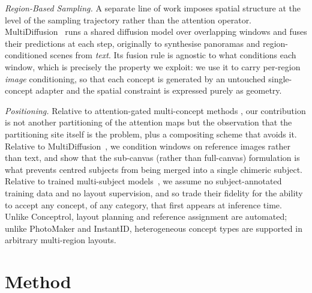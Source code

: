 \documentclass[review,10pt,times]{elsarticle}
\begin{document}
\noindent\textit{Region-Based Sampling.}
A separate line of work imposes spatial structure at the level of the
sampling trajectory rather than the attention operator.
MultiDiffusion~\cite{bartal2023multidiffusion} runs a shared diffusion
model over overlapping windows and fuses their predictions at each
step, originally to synthesise panoramas and region-conditioned scenes
from \emph{text}.  Its fusion rule is agnostic to what conditions each
window, which is precisely the property we exploit: we use it to carry
per-region \emph{image} conditioning, so that each concept is generated
by an untouched single-concept adapter and the spatial constraint is
expressed purely as geometry.

\noindent\textit{Positioning.}
Relative to attention-gated multi-concept methods
\cite{he2025conceptrol,mc2_2025,latexblend2025,freecustom2024,yu2025anyms},
our contribution is not another partitioning of the attention maps but
the observation that the partitioning site itself is the problem, plus
a compositing scheme that avoids it.  Relative to
MultiDiffusion~\cite{bartal2023multidiffusion}, we condition windows on
reference images rather than text, and show that the sub-canvas (rather
than full-canvas) formulation is what prevents centred subjects from
being merged into a single chimeric subject.  Relative to trained
multi-subject models~\cite{xiao2024fastcomposer,wang2025msdiffusion,ma2024subject},
we assume no subject-annotated training data and no layout supervision,
and so trade their fidelity for the ability to accept any concept, of any
category, that first appears at inference time.  Unlike Conceptrol, layout
planning and reference assignment are automated; unlike PhotoMaker and
InstantID, heterogeneous concept types are supported in arbitrary
multi-region layouts.

\section{Method}
\label{sec:method}
\end{document}
